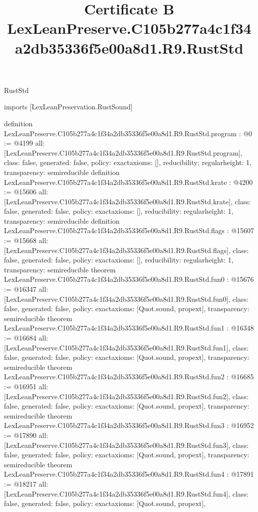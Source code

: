 \begin{lexlean}{RustStd}
\title{Certificate B LexLeanPreserve.C105b277a4c1f34a2db35336f5e00a8d1.R9.RustStd}
\begin{coremodule}
imports [LexLeanPreservation.RustSound]

definition LexLeanPreserve.C105b277a4c1f34a2db35336f5e00a8d1.R9.RustStd.program : @0 := @4199 {
  all: [LexLeanPreserve.C105b277a4c1f34a2db35336f5e00a8d1.R9.RustStd.program],
  class: false,
  generated: false,
  policy: exact{axioms: []},
  reducibility: regular{height: 1},
  transparency: semireducible
}
definition LexLeanPreserve.C105b277a4c1f34a2db35336f5e00a8d1.R9.RustStd.krate : @4200 := @15606 {
  all: [LexLeanPreserve.C105b277a4c1f34a2db35336f5e00a8d1.R9.RustStd.krate],
  class: false,
  generated: false,
  policy: exact{axioms: []},
  reducibility: regular{height: 1},
  transparency: semireducible
}
definition LexLeanPreserve.C105b277a4c1f34a2db35336f5e00a8d1.R9.RustStd.flags : @15607 := @15668 {
  all: [LexLeanPreserve.C105b277a4c1f34a2db35336f5e00a8d1.R9.RustStd.flags],
  class: false,
  generated: false,
  policy: exact{axioms: []},
  reducibility: regular{height: 1},
  transparency: semireducible
}
theorem LexLeanPreserve.C105b277a4c1f34a2db35336f5e00a8d1.R9.RustStd.fun0 : @15676 := @16347 {
  all: [LexLeanPreserve.C105b277a4c1f34a2db35336f5e00a8d1.R9.RustStd.fun0],
  class: false,
  generated: false,
  policy: exact{axioms: [Quot.sound, propext]},
  transparency: semireducible
}
theorem LexLeanPreserve.C105b277a4c1f34a2db35336f5e00a8d1.R9.RustStd.fun1 : @16348 := @16684 {
  all: [LexLeanPreserve.C105b277a4c1f34a2db35336f5e00a8d1.R9.RustStd.fun1],
  class: false,
  generated: false,
  policy: exact{axioms: [Quot.sound, propext]},
  transparency: semireducible
}
theorem LexLeanPreserve.C105b277a4c1f34a2db35336f5e00a8d1.R9.RustStd.fun2 : @16685 := @16951 {
  all: [LexLeanPreserve.C105b277a4c1f34a2db35336f5e00a8d1.R9.RustStd.fun2],
  class: false,
  generated: false,
  policy: exact{axioms: [Quot.sound, propext]},
  transparency: semireducible
}
theorem LexLeanPreserve.C105b277a4c1f34a2db35336f5e00a8d1.R9.RustStd.fun3 : @16952 := @17890 {
  all: [LexLeanPreserve.C105b277a4c1f34a2db35336f5e00a8d1.R9.RustStd.fun3],
  class: false,
  generated: false,
  policy: exact{axioms: [Quot.sound, propext]},
  transparency: semireducible
}
theorem LexLeanPreserve.C105b277a4c1f34a2db35336f5e00a8d1.R9.RustStd.fun4 : @17891 := @18217 {
  all: [LexLeanPreserve.C105b277a4c1f34a2db35336f5e00a8d1.R9.RustStd.fun4],
  class: false,
  generated: false,
  policy: exact{axioms: [Quot.sound, propext]},
}
\end{coremodule}
\end{lexlean}
